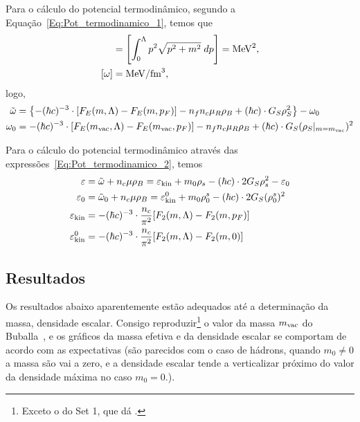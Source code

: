 \begin{enumerate}
Para o cálculo do potencial termodinâmico, segundo a Equação~\ref{Eq:Pot_termodinamico_1}, temos que
\begin{align}
	[F_E] &= \left[\int_0^\Lambda p^2\sqrt{p^2+m^2} \;dp\right] = \rm{MeV}^2, \\
	[\omega] &= \rm{MeV}/\rm{fm}^3,
\end{align}
%
logo,
\begin{align}
	\tilde{\omega} &= \left\{- (\hbar c)^{-3} \cdot [F_E(m, \Lambda) - F_E(m, p_F)] - n_fn_c\mu_R\rho_B + (\hbar c) \cdot G_S\rho_S^2\right\} - \omega_0 \\
	\omega_0 &= - (\hbar c)^{-3} \cdot [F_E(m_{\rm{vac}}, \Lambda) - F_E(m_{\rm{vac}}, p_F)] - n_fn_c\mu_R\rho_B + (\hbar c) \cdot G_S(\rho_S|_{m = m_{\rm{vac}}})^2
\end{align}

Para o cálculo do potencial termodinâmico através das expressões~\eqref{Eq:Pot_termodinamico_2}, temos
\begin{subequations}
\begin{align}
	\varepsilon &= \tilde{\omega} + n_c\mu\rho_B = \varepsilon_{\rm{kin}} + m_0\rho_s - (\hbar c) \cdot 2G_S\rho_s^2 - \varepsilon_0\\
	\varepsilon_0 &= \tilde{\omega}_0 + n_c\mu\rho_B = \varepsilon_{\rm{kin}}^0 + m_0\rho_0^s - (\hbar c) \cdot 2G_S(\rho_0^s)^2 \\
	\varepsilon_{\rm{kin}} &= -(\hbar c)^{-3} \cdot \frac{n_c}{\pi^2} [F_2(m, \Lambda) - F_2(m, p_F)] \\
	\varepsilon_{\rm{kin}}^0 &= -(\hbar c)^{-3} \cdot \frac{n_c}{\pi^2} [F_2(m, \Lambda) - F_2(m, 0)]
\end{align}
\end{subequations}

\subsection{Resultados}

Os resultados abaixo aparentemente estão adequados até a determinação da massa, densidade escalar. Consigo reproduzir\footnote{Exceto o do Set 1, que dá .} o valor da massa $m_{\rm{vac}}$ do Buballa~\cite{Buballa1996}, e os gráficos da massa efetiva e da densidade escalar se comportam de acordo com as expectativas (são parecidos com o caso de hádrons, quando $m_0 \neq 0$ a massa são vai a zero, e a densidade escalar tende a verticalizar próximo do valor da densidade máxima no caso $m_0 = 0$.).


\end{enumerate}
